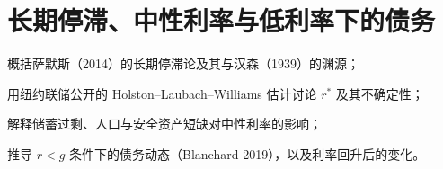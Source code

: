 \chapter{长期停滞、中性利率与低利率下的债务}\label{ch:stagnation}

\begin{chapterguide}
\begin{guidegoals}
\item 概括萨默斯（2014）的长期停滞论及其与汉森（1939）的渊源；
\item 用纽约联储公开的 Holston–Laubach–Williams 估计讨论 $r^{*}$ 及其不确定性；
\item 解释储蓄过剩、人口与安全资产短缺对中性利率的影响；
\item 推导 $r<g$ 条件下的债务动态（Blanchard 2019），以及利率回升后的变化。
\end{guidegoals}
\end{chapterguide}

\chapterstub
